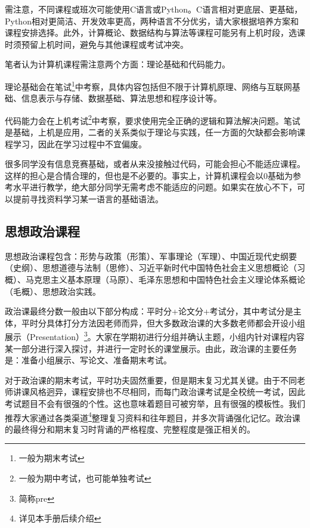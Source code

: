 \documentclass[11pt,oneside]{book}
\begin{document}
需注意，不同课程或班次可能使用C语言或Python。C语言相对更底层、更基础，Python相对更简洁、开发效率更高，两种语言不分优劣，请大家根据培养方案和课程安排选择。此外，计算概论、数据结构与算法等课程可能另有上机时段，选课时须预留上机时间，避免与其他课程或考试冲突。

\vspace{10pt}

笔者认为计算机课程需注意两个方面：理论基础和代码能力。

\vspace{10pt}

理论基础会在笔试\footnote{一般为期末考试}中考察，具体内容包括但不限于计算机原理、网络与互联网基础、信息表示与存储、数据基础、算法思想和程序设计等。

\vspace{10pt}

代码能力会在上机考试\footnote{一般为期中考试，也可能单独考试}中考察，要求使用完全正确的逻辑和算法解决问题。笔试是基础，上机是应用，二者的关系类似于理论与实践，任一方面的欠缺都会影响课程学习，因此在学习过程中不宜偏废。

\vspace{10pt}

很多同学没有信息竞赛基础，或者从来没接触过代码，可能会担心不能适应课程。这样的担心是合情合理的，但也是不必要的。事实上，计算机课程会以0基础为参考水平进行教学，绝大部分同学无需考虑不能适应的问题。如果实在放心不下，可以提前寻找资料学习某一语言的基础语法。

\subsection{思想政治课程}
思想政治课程包含：形势与政策（形策）、军事理论（军理）、中国近现代史纲要（史纲）、思想道德与法制（思修）、习近平新时代中国特色社会主义思想概论（习概）、马克思主义基本原理（马原）、毛泽东思想和中国特色社会主义理论体系概论（毛概）、思想政治实践。

\vspace{10pt}

政治课最终分数一般由以下部分构成：平时分+论文分+考试分，其中考试分是主体，平时分具体打分方法因老师而异，但大多数政治课的大多数老师都会开设小组展示（Presentation）\footnote{简称pre}。大家在学期初进行分组并确认主题，小组内针对课程内容某一部分进行深入探讨，并进行一定时长的课堂展示。由此，政治课的主要任务是：准备小组展示、写论文、准备期末考试。

\vspace{10pt}

对于政治课的期末考试，平时功夫固然重要，但是期末复习尤其关键。由于不同老师讲课风格迥异，课程安排也不尽相同，而每门政治课考试是全校统一考试，因此考试题目不会有很强的个性。这也意味着题目可被穷举，且有很强的模板性。我们推荐大家通过各类渠道\footnote{详见本手册后续介绍}整理复习资料和往年题目，并多次背诵强化记忆。政治课的最终得分和期末复习时背诵的严格程度、完整程度是强正相关的。
\end{document}
